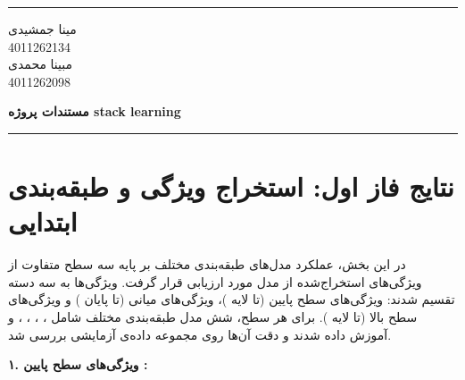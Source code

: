 \documentclass[a4paper,12pt]{article}
\newcommand{\StudentOne}{4011262134}
\newcommand{\StudentTwo}{4011262098}
\newcommand{\NameOne}{مینا جمشیدی}
\newcommand{\NameTwo}{مبینا محمدی}
\newcommand{\ProjectName}{مستندات پروژه stack learning}
\let\nobreaksection\section
\renewcommand{\section}{\nobreaksection}
\begin{document}
	

	\hrule \medskip
	\begin{minipage}{0.3\textwidth}
		\raggedright
		\small
		\NameOne \\
		\StudentOne \\
		\NameTwo \\
		\StudentTwo
	\end{minipage}
	\begin{minipage}{0.4\textwidth} 
		\centering 
		\large\bfseries
		\ProjectName \\
	\end{minipage}
	\begin{minipage}{0.3\textwidth}
		\raggedleft
		\small
	\end{minipage}
	\medskip\hrule 
	\vspace*{1.5cm}  
	
\section{نتایج فاز اول: استخراج ویژگی و طبقه‌بندی ابتدایی}


در این بخش، عملکرد مدل‌های طبقه‌بندی مختلف بر پایه سه سطح متفاوت از ویژگی‌های استخراج‌شده از مدل  مورد ارزیابی قرار گرفت. ویژگی‌ها به سه دسته تقسیم شدند: ویژگی‌های سطح پایین (تا لایه )، ویژگی‌های میانی (تا پایان ) و ویژگی‌های سطح بالا (تا لایه ). برای هر سطح، شش مدل طبقه‌بندی مختلف شامل ، ، ، ،  و  آموزش داده شدند و دقت آن‌ها روی مجموعه داده‌ی آزمایشی بررسی شد.

\vspace{0.5cm}
\textbf{۱. ویژگی‌های سطح پایین :}
\end{document}

